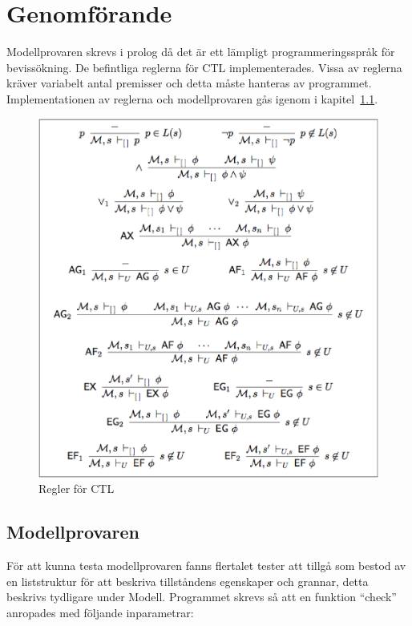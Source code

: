 \section{Genomförande}
Modellprovaren skrevs i prolog då det är ett lämpligt programmeringsspråk för bevissökning. De befintliga reglerna för CTL implementerades. Vissa av reglerna kräver variabelt antal premisser och detta måste hanteras av programmet. Implementationen av reglerna och modellprovaren gås igenom i kapitel~\ref{modellprovaren}.

\begin{figure}[hb]
\includegraphics[width=\textwidth]{formulas.eps}
\caption{Regler för CTL}
\label{fig:ctl-regler}
\end{figure}
\subsection{Modellprovaren}\label{modellprovaren}

För att kunna testa modellprovaren fanns flertalet tester att tillgå som bestod av en liststruktur för att beskriva tillståndens egenskaper och grannar, detta beskrivs tydligare under Modell.
Programmet skrevs så att en funktion “check” anropades med följande inparametrar:

